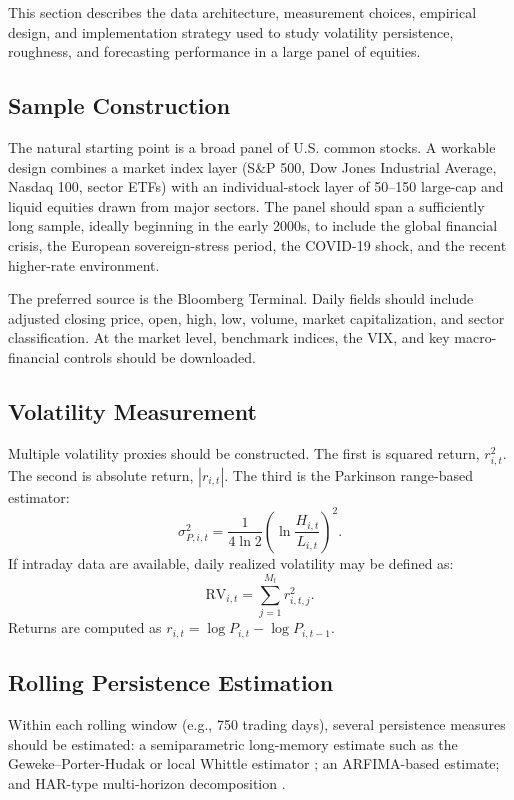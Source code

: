 \documentclass[12pt]{article}
\begin{document}
This section describes the data architecture, measurement choices, empirical design, and implementation strategy used to study volatility persistence, roughness, and forecasting performance in a large panel of equities.

\subsection{Sample Construction}

The natural starting point is a broad panel of U.S. common stocks. A workable design combines a market index layer (S\&P 500, Dow Jones Industrial Average, Nasdaq 100, sector ETFs) with an individual-stock layer of 50--150 large-cap and liquid equities drawn from major sectors. The panel should span a sufficiently long sample, ideally beginning in the early 2000s, to include the global financial crisis, the European sovereign-stress period, the COVID-19 shock, and the recent higher-rate environment.

The preferred source is the Bloomberg Terminal. Daily fields should include adjusted closing price, open, high, low, volume, market capitalization, and sector classification. At the market level, benchmark indices, the VIX, and key macro-financial controls should be downloaded.

\subsection{Volatility Measurement}

Multiple volatility proxies should be constructed. The first is squared return, $r_{i,t}^2$. The second is absolute return, $|r_{i,t}|$. The third is the Parkinson range-based estimator:
\[
\sigma_{P,i,t}^2 = \frac{1}{4\ln 2}\left(\ln \frac{H_{i,t}}{L_{i,t}}\right)^2.
\]
If intraday data are available, daily realized volatility may be defined as:
\[
\mathrm{RV}_{i,t} = \sum_{j=1}^{M_t} r_{i,t,j}^2.
\]
Returns are computed as $r_{i,t} = \log P_{i,t} - \log P_{i,t-1}$.

\subsection{Rolling Persistence Estimation}

Within each rolling window (e.g., 750 trading days), several persistence measures should be estimated: a semiparametric long-memory estimate such as the Geweke--Porter-Hudak or local Whittle estimator \citep{GewekerPorterHudak1983, Robinson1995}; an ARFIMA-based estimate; and HAR-type multi-horizon decomposition \citep{Corsi2009}.
\end{document}
